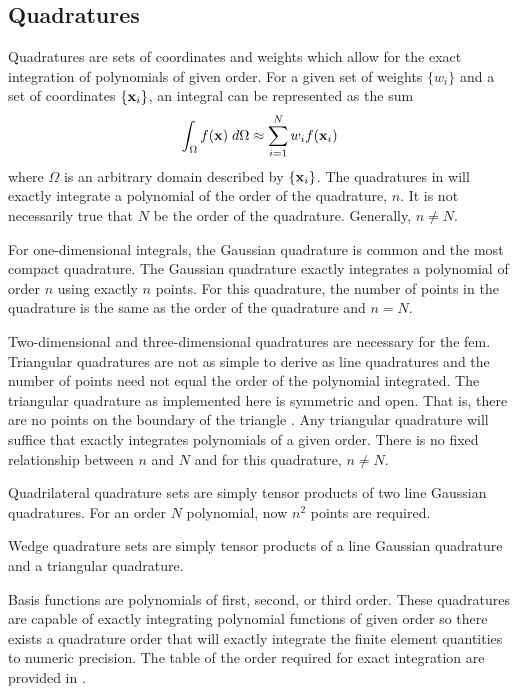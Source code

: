   \subsection{Quadratures}
    \label{sec:quadratures}
    Quadratures are sets of coordinates and weights which allow for the exact 
    integration of polynomials of given order. For a given set of weights 
    $\{w_i\}$ and a set of coordinates $\{\mathbf{x}_i\}$, an integral can be 
    represented as the sum
    \begin{equation}
      \label{eq:quadrature}
      \int_{\Omega} f(\mathbf{x}) \;d\Omega \approx \sum_{i=1}^{N} w_i f(\mathbf{x}_i)
    \end{equation}
    where $\Omega$ is an arbitrary domain described by $\{\mathbf{x}_i\}$. The 
    quadratures in  will exactly integrate a polynomial of
    the order of the quadrature, $n$. It is not necessarily true that $N$ be the 
    order of the quadrature. Generally, $n \ne N$.
    
    For one-dimensional integrals, the Gaussian quadrature is common and the 
    most compact quadrature. The Gaussian quadrature exactly integrates a 
    polynomial of order $n$ using exactly $n$ points. For this quadrature, the
    number of points in the quadrature is the same as the order of the
    quadrature and $n=N$.
    
    Two-dimensional and three-dimensional quadratures are necessary for the 
    \gls{fem}. Triangular quadratures are not as simple to derive
    as line quadratures and the number of points need not equal the order of the
    polynomial integrated. The triangular quadrature as implemented here is 
    symmetric and open. That is, there are no points on the boundary of the 
    triangle \cite{triangleQuadrature}. Any triangular quadrature will suffice
    that exactly integrates polynomials of a given order. There is no fixed
    relationship between $n$ and $N$ and for this quadrature, $n \ne N$.
    
    Quadrilateral quadrature sets are simply tensor products of two line 
    Gaussian quadratures. For an order $N$ polynomial, now $n^2$ points are 
    required. 
    
    Wedge quadrature sets are simply tensor products of a line Gaussian 
    quadrature and a triangular quadrature. 
    
    Basis functions are polynomials of first, second, or third order. These 
    quadratures are capable of exactly integrating polynomial functions of given
    order so there exists a quadrature order that will exactly integrate the 
    finite element quantities to numeric precision. The table of the order
    required for exact integration are provided in .

